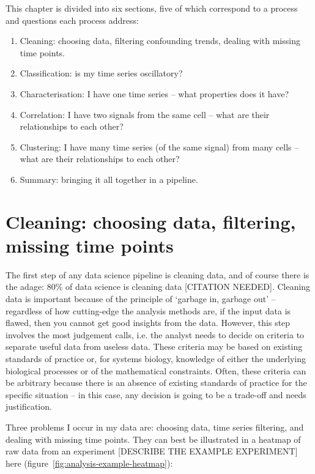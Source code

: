 This chapter is divided into six sections, five of which correspond to a process and questions each process address:
\begin{enumerate}
  \item Cleaning: choosing data, filtering confounding trends, dealing with missing time points.
  \item Classification: is my time series oscillatory?
  \item Characterisation: I have one time series -- what properties does it have?
  \item Correlation: I have two signals from the same cell -- what are their relationships to each other?
  \item Clustering: I have many time series (of the same signal) from many cells -- what are their relationships to each other?
  \item Summary: bringing it all together in a pipeline.
\end{enumerate}

\section[Cleaning]{Cleaning: choosing data, filtering, missing time points}
\label{sec:analysis-cleaning}

The first step of any data science pipeline is cleaning data, and of course there is the adage: 80\% of data science is cleaning data [CITATION NEEDED].
Cleaning data is important because of the principle of `garbage in, garbage out' -- regardless of how cutting-edge the analysis methods are, if the input data is flawed, then you cannot get good insights from the data.
However, this step involves the most judgement calls, i.e. the analyst needs to decide on criteria to separate useful data from useless data.
These criteria may be based on existing standards of practice or, for systems biology, knowledge of either the underlying biological processes or of the mathematical constraints.
Often, these criteria can be arbitrary because there is an absence of existing standards of practice for the specific situation -- in this case, any decision is going to be a trade-off and needs justification.

Three problems I occur in my data are: choosing data, time series filtering, and dealing with missing time points.
They can best be illustrated in a heatmap of raw data from an experiment [DESCRIBE THE EXAMPLE EXPERIMENT] here (figure~\ref{fig:analysis-example-heatmap}):

